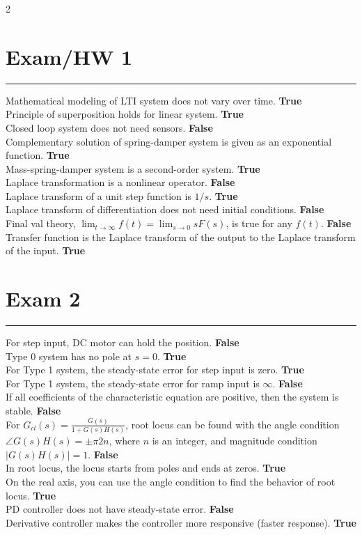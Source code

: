 \documentclass[letterpaper,10pt]{article}
\let\oldsection\section
\renewcommand{\section}[1]{%
\vspace{-1em}
  \oldsection{#1}%
  \par\vspace{-2em}%
  \noindent\rule{0.5\textwidth}{0.5pt}%
  \vspace{0em}%
}
\begin{document}
\small
\begin{multicols}{2}



\section{Exam/HW 1}
Mathematical modeling of LTI system does not vary over time. \textbf{True}\\
Principle of superposition holds for linear system. \textbf{True}\\
Closed loop system does not need sensors. \textbf{False}\\
Complementary solution of spring-damper system is given as an exponential function. \textbf{True}\\
Mass-spring-damper system is a second-order system. \textbf{True}\\
Laplace transformation is a nonlinear operator. \textbf{False}\\
Laplace transform of a unit step function is $1/s$. \textbf{True}\\
Laplace transform of differentiation does not need initial conditions. \textbf{False}\\
Final val theory, $\lim_{t \to \infty} f(t) = \lim_{s \to 0} sF(s)$, is true for any $f(t)$. \textbf{False}\\
Transfer function is the Laplace transform of the output to the Laplace transform of the input. \textbf{True}
\section{Exam 2}
For step input, DC motor can hold the position. \textbf{False}\\
Type 0 system has no pole at $s = 0$. \textbf{True}\\
For Type 1 system, the steady-state error for step input is zero. \textbf{True}\\
For Type 1 system, the steady-state error for ramp input is $\infty$. \textbf{False}\\
If all coefficients of the characteristic equation are positive, then the system is stable. \textbf{False}\\
For $G_{cl}(s) = \frac{G(s)}{1 + G(s)H(s)}$, root locus can be found with the angle condition $\angle G(s)H(s) = \pm\pi 2n$, where $n$ is an integer, and magnitude condition $|G(s)H(s)| = 1$. \textbf{False}\\
In root locus, the locus starts from poles and ends at zeros. \textbf{True}\\
On the real axis, you can use the angle condition to find the behavior of root locus. \textbf{True}\\
PD controller does not have steady-state error. \textbf{False}\\
Derivative controller makes the controller more responsive (faster response). \textbf{True}


\end{multicols}
\end{document}
